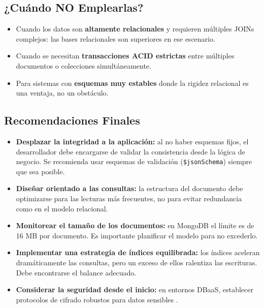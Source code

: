 \documentclass[conference]{IEEEtran}
\begin{document}
\subsection{¿Cuándo NO Emplearlas?}
\begin{itemize}
    \item Cuando los datos son \textbf{altamente relacionales} y requieren múltiples JOINs complejos: las bases relacionales son superiores en ese escenario.
    \item Cuando se necesitan \textbf{transacciones ACID estrictas} entre múltiples documentos o colecciones simultáneamente.
    \item Para sistemas con \textbf{esquemas muy estables} donde la rigidez relacional es una ventaja, no un obstáculo.
\end{itemize}

\subsection{Recomendaciones Finales}
\begin{itemize}
    \item \textbf{Desplazar la integridad a la aplicación:} al no haber esquemas fijos, el desarrollador debe encargarse de validar la consistencia desde la lógica de negocio. Se recomienda usar esquemas de validación (\texttt{\$jsonSchema}) siempre que sea posible.
    \item \textbf{Diseñar orientado a las consultas:} la estructura del documento debe optimizarse para las lecturas más frecuentes, no para evitar redundancia como en el modelo relacional.
    \item \textbf{Monitorear el tamaño de los documentos:} en MongoDB el límite es de 16 MB por documento. Es importante planificar el modelo para no excederlo.
    \item \textbf{Implementar una estrategia de índices equilibrada:} los índices aceleran dramáticamente las consultas, pero un exceso de ellos ralentiza las escrituras. Debe encontrarse el balance adecuado.
    \item \textbf{Considerar la seguridad desde el inicio:} en entornos DBaaS, establecer protocolos de cifrado robustos para datos sensibles \cite{khan2023}.
\end{itemize}



\appendices
\end{document}
